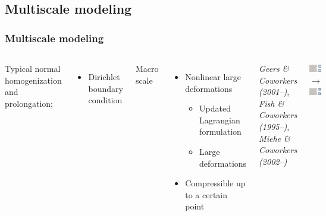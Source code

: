 \documentclass[11pt,mathserif]{beamer}
\newcommand{\roughcite}[1]{\textit{#1}}
\begin{document}
\subsection{Multiscale modeling}
\begin{frame}
 \frametitle{Multiscale modeling}
\begin{columns}
Typical normal homogenization and prolongation;
 \begin{itemize}
  \item Dirichlet boundary condition
 \end{itemize}

 Macro scale
 \begin{itemize}
  \item Nonlinear large deformations
  \begin{itemize}
   \item Updated Lagrangian formulation
   \item Large deformations
  \end{itemize}
  \item Compressible up to a certain point
 \end{itemize}

 \roughcite{Geers \& Coworkers (2001--)}, \roughcite{Fish \& Coworkers (1995--)}, \roughcite{Miehe \& Coworkers (2002--)}


\begin{center}
 \includegraphics[width=0.9\textwidth]{figures/Sintering_5x5_000.png}\\
 $\longrightarrow$\\[0.5em]
 \includegraphics[width=0.9\textwidth]{figures/Sintering_5x5_114.png}
\end{center}
\end{columns}
\end{frame}
\end{document}
